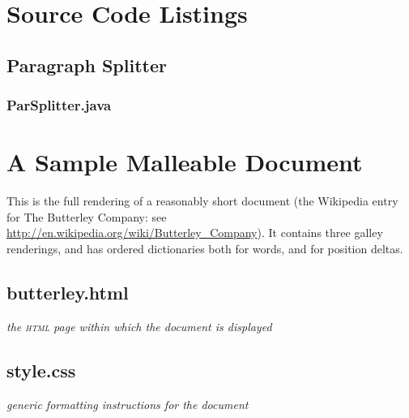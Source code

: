 \chapter{Source Code Listings}


\section{Paragraph Splitter}
\label{app:parsplitter}
\subsection{ParSplitter.java}
%

\newpage

\cleardoublepage
\chapter{A Sample Malleable Document}
\label{app:sampledoc}

This is the full rendering of a reasonably short document (the Wikipedia entry for The Butterley Company: see \url{http://en.wikipedia.org/wiki/Butterley_Company}). It contains three galley renderings, and has ordered dictionaries both for words, and for position deltas.

\section{butterley.html}
\emph{the \textsc{html} page within which the document is displayed}
%

\section{style.css}
\emph{generic formatting instructions for the document}
%
\newpage

